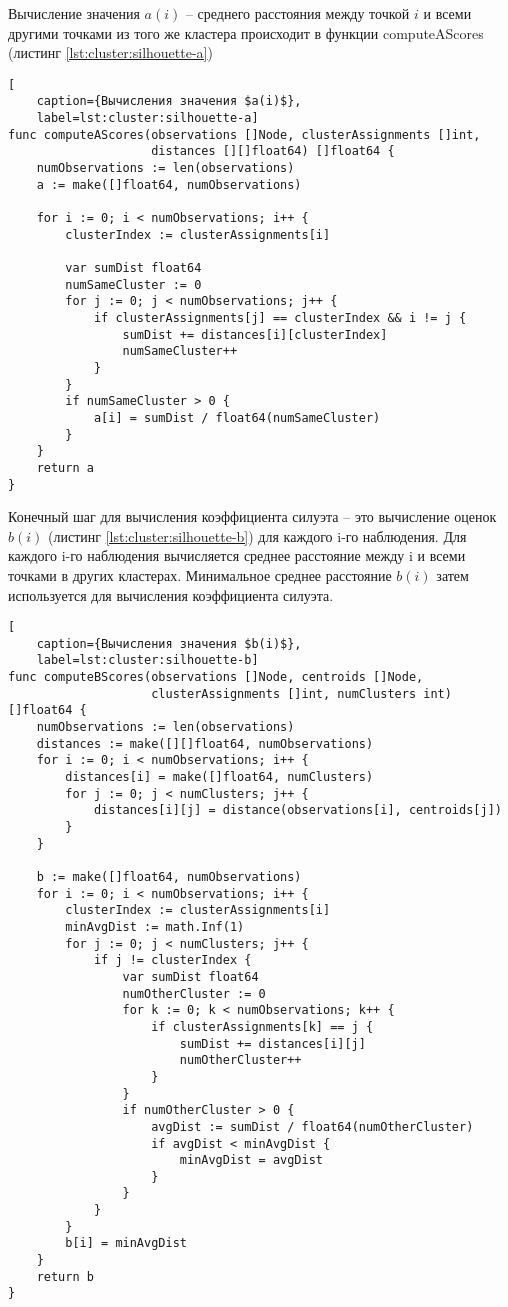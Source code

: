 Вычисление значения $a(i)$ -- среднего расстояния между точкой $i$ и всеми другими точками из того же кластера происходит в функции computeAScores (листинг \ref{lst:cluster:silhouette-a})
\begin{lstlisting}[
	caption={Вычисления значения $a(i)$},
	label=lst:cluster:silhouette-a]
func computeAScores(observations []Node, clusterAssignments []int, 
					distances [][]float64) []float64 {
	numObservations := len(observations)
	a := make([]float64, numObservations)
	
	for i := 0; i < numObservations; i++ {
		clusterIndex := clusterAssignments[i]
		
		var sumDist float64
		numSameCluster := 0
		for j := 0; j < numObservations; j++ {
			if clusterAssignments[j] == clusterIndex && i != j {
				sumDist += distances[i][clusterIndex]
				numSameCluster++
			}
		}
		if numSameCluster > 0 {
			a[i] = sumDist / float64(numSameCluster)
		}
	}
	return a
}
\end{lstlisting}
Конечный шаг для вычисления коэффициента силуэта -- это вычисление оценок $b(i)$ (листинг \ref{lst:cluster:silhouette-b}) для каждого i-го наблюдения. Для каждого i-го наблюдения вычисляется среднее расстояние между i и всеми точками в других кластерах. Минимальное среднее расстояние $b(i)$ затем используется для вычисления коэффициента силуэта.
\begin{lstlisting}[
	caption={Вычисления значения $b(i)$},
	label=lst:cluster:silhouette-b]
func computeBScores(observations []Node, centroids []Node, 
					clusterAssignments []int, numClusters int) []float64 {
	numObservations := len(observations)
	distances := make([][]float64, numObservations)
	for i := 0; i < numObservations; i++ {
		distances[i] = make([]float64, numClusters)
		for j := 0; j < numClusters; j++ {
			distances[i][j] = distance(observations[i], centroids[j])
		}
	}
	
	b := make([]float64, numObservations)
	for i := 0; i < numObservations; i++ {
		clusterIndex := clusterAssignments[i]
		minAvgDist := math.Inf(1)
		for j := 0; j < numClusters; j++ {
			if j != clusterIndex {
				var sumDist float64
				numOtherCluster := 0
				for k := 0; k < numObservations; k++ {
					if clusterAssignments[k] == j {
						sumDist += distances[i][j]
						numOtherCluster++
					}
				}
				if numOtherCluster > 0 {
					avgDist := sumDist / float64(numOtherCluster)
					if avgDist < minAvgDist {
						minAvgDist = avgDist
					}
				}
			}
		}
		b[i] = minAvgDist
	}
	return b
}

\end{lstlisting}


